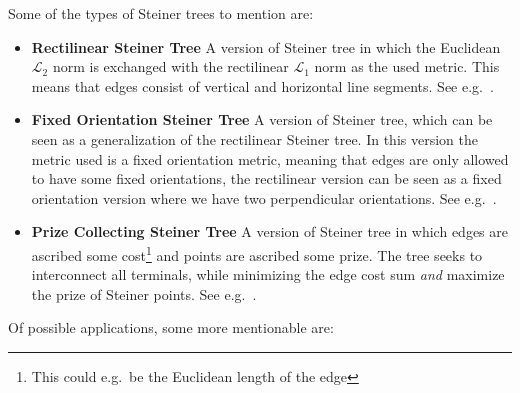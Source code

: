 Some of the types of Steiner trees to mention are:
%
\begin{itemize}
\item \textbf{Rectilinear Steiner Tree} \quad A version of Steiner tree in which
  the Euclidean $\mathcal{L}_2$ norm is exchanged with the rectilinear
  $\mathcal{L}_1$ norm as the used metric. This means that edges consist of
  vertical and horizontal line segments. See e.g.~\textcite[ch.~3]{brazil2015}.
\item \textbf{Fixed Orientation Steiner Tree} \quad A version of Steiner tree,
  which can be seen as a generalization of the rectilinear Steiner tree. In this
  version the metric used is a fixed orientation metric, meaning that edges are
  only allowed to have some fixed orientations, the rectilinear version can be
  seen as a fixed orientation version where we have two perpendicular
  orientations. See e.g.~\textcite[ch.~2]{brazil2015}.
\item \textbf{Prize Collecting Steiner Tree} \quad A version of Steiner tree in
  which edges are ascribed some cost\footnote{This could e.g.\ be the Euclidean
    length of the edge} and points are ascribed some prize. The tree seeks to
  interconnect all terminals, while minimizing the edge cost sum \textit{and}
  maximize the prize of Steiner points. See e.g.~\textcite{johnson2000}.
\end{itemize}
%
Of possible applications, some more mentionable are:
%

